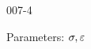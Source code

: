 \begin{mitframe}{007-4}
\begin{listone}
\begin{listtwo}
    		\item Parameters: $\molecrad, \partpoten$
	
    
    	\end{listtwo}
    
	 \end{listone}

\end{mitframe}